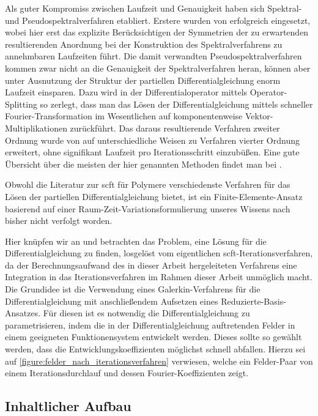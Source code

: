 \documentclass[../main.tex]{subfiles}
\begin{document}
Als guter Kompromiss zwischen Laufzeit und Genauigkeit haben sich Spektral- und Pseudospektralverfahren etabliert.
Erstere wurden von \textcite{Matsen:1994bz} erfolgreich eingesetzt, wobei hier erst das explizite Berücksichtigen der Symmetrien der zu erwartenden resultierenden Anordnung bei der Konstruktion des Spektralverfahrens zu annehmbaren Laufzeiten führt.
Die damit verwandten Pseudospektralverfahren kommen zwar nicht an die Genauigkeit der Spektralverfahren heran, können aber unter Ausnutzung der Struktur der partiellen Differentialgleichung enorm Laufzeit einsparen.
Dazu wird in \cite{Rasmussen:2002kt} der Differentialoperator mittels Operator-Splitting so zerlegt, dass man das Lösen der Differentialgleichung mittels schneller Fourier-Transformation im Wesentlichen auf komponentenweise Vektor-Multiplikationen zurückführt.
Das daraus resultierende Verfahren zweiter Ordnung wurde von \cite{GarciaCervera:2006uu,Ranjan:2007kl} auf unterschiedliche Weisen zu Verfahren vierter Ordnung erweitert, ohne signifikant Laufzeit pro Iterationsschritt einzubüßen.
Eine gute Übersicht über die meisten der hier genannten Methoden findet man bei \textcites[Section 3.6]{Fredrickson:2006th}{Audus:2013ep}.

Obwohl die Literatur zur \ac{scft} für Polymere verschiedenste Verfahren für das Lösen der partiellen Differentialgleichung bietet, ist ein Finite-Elemente-Ansatz basierend auf einer Raum-Zeit-Variationsformulierung unseres Wissens nach bisher nicht verfolgt worden.

Hier knüpfen wir an und betrachten das Problem, eine Lösung für die Differentialgleichung zu finden, losgelöst vom eigentlichen \ac{scft}-Iterationsverfahren, da der Berechnungsaufwand des in dieser Arbeit hergeleiteten Verfahrens eine Integration in das Iterationsverfahren im Rahmen dieser Arbeit unmöglich macht.
Die Grundidee ist die Verwendung eines Galerkin-Verfahrens für die Differentialgleichung mit anschließendem Aufsetzen eines Reduzierte-Basis-Ansatzes.
Für diesen ist es notwendig die Differentialgleichung zu parametrisieren, indem die in der Differentialgleichung auftretenden Felder in einem geeigneten Funktionensystem entwickelt werden.
Dieses sollte so gewählt werden, dass die Entwicklungskoeffizienten möglichst schnell abfallen.
Hierzu sei auf \cref{figure:felder_nach_iterationsverfahren} verwiesen, welche ein Felder-Paar von einem Iterationsdurchlauf und dessen Fourier-Koeffizienten zeigt.


\subsection*{Inhaltlicher Aufbau}
\end{document}
